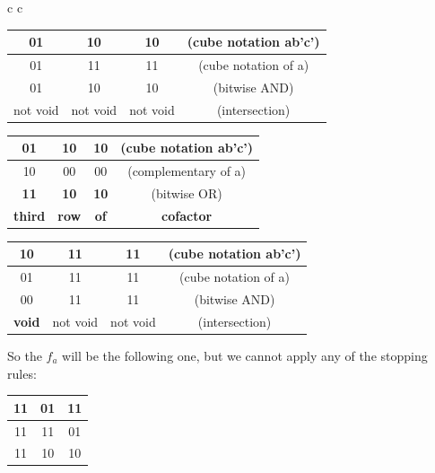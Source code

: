 \begin{center}
	\begin{tabular}{c  c}
		\begin{tabular}{c | c | c c}
			01 & 10 & 10 & (cube notation ab'c') \\ \hline
			01 & 11 & 11 & (cube notation of a)\\ \hline 
			01 & 10 & 10 & (bitwise AND) \\ \hline
			not void & not void & not void & (intersection)
		\end{tabular}
		\quad
		\quad
		\quad
		\begin{tabular}{c  c  c c}
			01 & 10 & 10 & (cube notation ab'c') \\ \hline
			10 & 00 & 00 & (complementary of a)\\ \hline 
			\textbf{11} & \textbf{10} & \textbf{10} & (bitwise OR) \\ \hline
			\textbf{third} & \textbf{row} & \textbf{of} & \textbf{cofactor} \\
		\end{tabular}
	\end{tabular}
\end{center}

\begin{center}
		\begin{tabular}{c | c | c c}
			10 & 11 & 11 & (cube notation ab'c') \\ \hline
			01 & 11 & 11 & (cube notation of a)\\ \hline 
			00 & 11 & 11 & (bitwise AND) \\ \hline
			\textbf{void} & not void & not void & (intersection)
		\end{tabular}
\end{center}

So the $f_{a}$ will be the following one, but we cannot apply any of the stopping rules:
\begin{center}
	\begin{tabular}{c | c | c}
		11 & 01 & 11 \\ \hline
		11 & 11 & 01 \\ \hline 
		11 & 10 & 10 \\ 
	\end{tabular}
\end{center}


